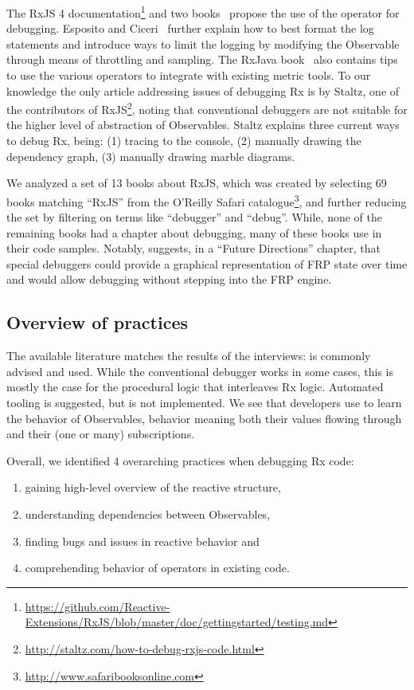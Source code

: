 The RxJS 4 documentation\footnote{
	\url{https://github.com/Reactive-Extensions/RxJS/blob/master/doc/gettingstarted/testing.md}
} and two books~\cite{esposito2016reactive,rxjavabook2016} propose the use of the  operator for debugging. Esposito and Ciceri~\cite{esposito2016reactive} further explain how to best format the log statements and introduce ways to limit the logging by modifying the Observable through means of throttling and sampling. The RxJava book~\cite{rxjavabook2016} also contains tips to use the various  operators to integrate with existing metric tools.
To our knowledge the only article addressing issues of debugging Rx is by Staltz, one of the contributors of RxJS\footnote{\url{http://staltz.com/how-to-debug-rxjs-code.html}}, noting that conventional debuggers are not suitable for the higher level of abstraction of Observables. Staltz explains three current ways to debug Rx, being: (1) tracing to the console, (2) manually drawing the dependency graph, (3) manually drawing marble diagrams.

We analyzed a set of 13 books about RxJS, which was created by selecting 69 books matching ``RxJS'' from the O'Reilly Safari catalogue\footnote{\url{http://www.safaribooksonline.com}}, and further reducing the set by filtering on terms like ``debugger'' and ``debug''. While, none of the remaining books had a chapter about debugging, many of these books use \printfdebugging{} in their code samples. Notably, \cite{frpbook2016} suggests, in a ``Future Directions'' chapter, that special debuggers could provide a graphical representation of FRP state over time and would allow debugging without stepping into the FRP engine.

\subsection{Overview of practices}
The available literature matches the results of the interviews: \printfdebugging{} is commonly advised and used. While the conventional debugger works in some cases, this is mostly the case for the procedural logic that interleaves Rx logic. Automated tooling is suggested, but is not implemented. We see that developers use \printfdebugging{} to learn the behavior of Observables, behavior meaning both their values flowing through and their (one or many) subscriptions. 

Overall, we identified 4 overarching practices when debugging Rx code:
\begin{enumerate}
\itemsep0em 
\item[(1)] gaining high-level overview of the reactive structure,
\item[(2)] understanding dependencies between Observables,
\item[(3)] finding bugs and issues in reactive behavior and
\item[(4)] comprehending behavior of operators in existing code.
\end{enumerate}